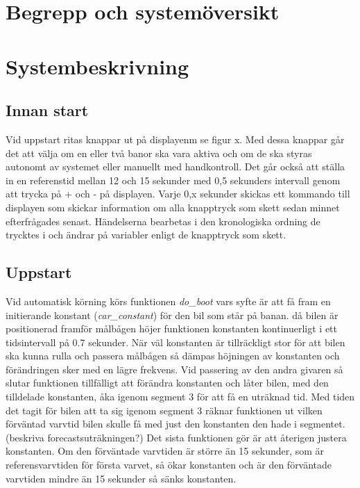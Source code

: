 \documentclass[10pt,oneside,swedish]{lips-no_customer}
\begin{document}
\section{Begrepp och systemöversikt}
\section{Systembeskrivning}

\subsection{Innan start}

Vid uppstart ritas knappar ut på displayenm se figur x. Med dessa knappar går
det att välja om en eller två banor ska vara aktiva och om de ska styras
autonomt av systemet eller manuellt med handkontroll. Det går också att ställa
in en referenstid mellan 12 och 15 sekunder med 0,5 sekunders intervall genom
att trycka på + och - på displayen. Varje 0,x sekunder skickas ett kommando till
displayen som skickar information om alla knapptryck som skett sedan minnet
efterfrågades senast. Händelserna bearbetas i den kronologiska ordning de
trycktes i och ändrar på variabler enligt de knapptryck som skett.

\subsection{Uppstart} 

Vid automatisk körning körs funktionen \emph{do\_boot} vars syfte är att få fram en
initierande konstant (\emph{car\_constant}) för den bil som står på banan. då bilen är
positionerad framför målbågen höjer funktionen konstanten kontinuerligt i ett
tidsintervall på 0.7 sekunder. När väl konstanten är tillräckligt stor för att
bilen ska kunna rulla och passera målbågen så dämpas höjningen av konstanten och förändringen sker med en lägre frekvens. Vid passering av den andra givaren så slutar
funktionen tillfälligt att förändra konstanten och låter bilen, med den
tilldelade konstanten, åka igenom segment 3 för att få en uträknad tid. Med
tiden det tagit för bilen att ta sig igenom segment 3 räknar funktionen ut
vilken förväntad varvtid bilen skulle få med just den konstanten den hade i
segmentet.  (beskriva forecastsuträkningen?) Det sista funktionen gör är att
återigen justera konstanten. Om den förväntade varvtiden är större än 15
sekunder, som är referensvarvtiden för första varvet, så ökar konstanten och är
den förväntade varvtiden mindre än 15 sekunder så sänks konstanten. 
\end{document}
